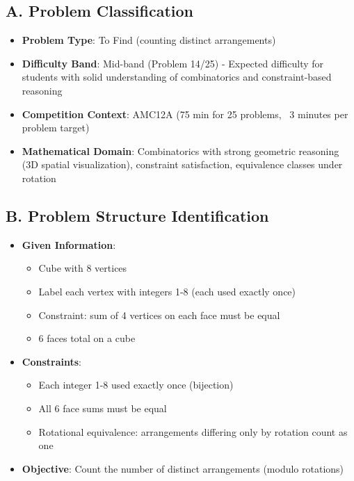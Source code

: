 \documentclass[]{article}
\begin{document}
\begin{problemconfigbox}
\subsection*{A. Problem Classification}
\begin{itemize}[leftmargin=*]
    \item \textbf{Problem Type}: To Find (counting distinct arrangements)
    \item \textbf{Difficulty Band}: Mid-band (Problem 14/25) - Expected difficulty for students with solid understanding of combinatorics and constraint-based reasoning
    \item \textbf{Competition Context}: AMC12A (75 min for 25 problems, ~3 minutes per problem target)
    \item \textbf{Mathematical Domain}: Combinatorics with strong geometric reasoning (3D spatial visualization), constraint satisfaction, equivalence classes under rotation
\end{itemize}

\subsection*{B. Problem Structure Identification}
\begin{itemize}[leftmargin=*]
    \item \textbf{Given Information}:
    \begin{itemize}
        \item Cube with 8 vertices
        \item Label each vertex with integers 1-8 (each used exactly once)
        \item Constraint: sum of 4 vertices on each face must be equal
        \item 6 faces total on a cube
    \end{itemize}
    
    \item \textbf{Constraints}:
    \begin{itemize}
        \item Each integer 1-8 used exactly once (bijection)
        \item All 6 face sums must be equal
        \item Rotational equivalence: arrangements differing only by rotation count as one
    \end{itemize}
    
    \item \textbf{Objective}: Count the number of distinct arrangements (modulo rotations)
    

\end{itemize}
\end{problemconfigbox}
\end{document}
